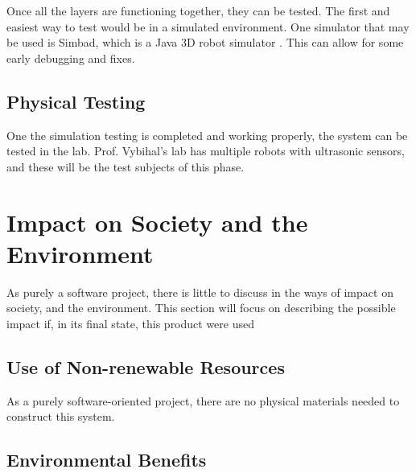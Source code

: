 \documentclass[titlepage,11pt]{article}
\begin{document}
Once all the layers are functioning together, they can be tested. The first and easiest way to test would be in a simulated environment. One simulator that may be used is Simbad, which is a Java 3D robot simulator \cite{simbad}. This can allow for some early debugging and fixes.

\subsection{Physical Testing}

One the simulation testing is completed and working properly, the system can be tested in the lab. Prof. Vybihal's lab has multiple robots with ultrasonic sensors, and these will be the test subjects of this phase.

\section{Impact on Society and the Environment}

As purely a software project, there is little to discuss in the ways of impact on society, and the environment. This section will focus on describing the possible impact if, in its final state, this product were used 

\subsection{Use of Non-renewable Resources}

As a purely software-oriented project, there are no physical materials needed to construct this system.

\subsection{Environmental Benefits}
\end{document}
